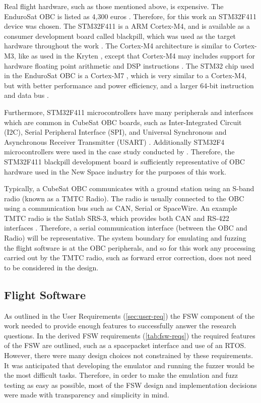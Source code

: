 \documentclass[../report.tex]{subfiles}
\begin{document}
Real flight hardware, such as those mentioned above, is expensive. The
EnduroSat OBC is listed as 4,300 euros \citep{EnduroSat_OBC}. Therefore, for
this work an STM32F411 device was chosen. The STM32F411 is a ARM Cortex-M4, and
is available as a consumer development board called blackpill, which was used
as the target hardware throughout the work \citep{blackpill_info}. The
Cortex-M4 architecture is similar to Cortex-M3, like as used in the Kryten
\citep{Clydespace_Kryten}, except that Cortex-M4 may includes support for
hardware floating point arithmetic and DSP instructions \citep{Cortex_M3}
\citep{Cortex_M4}. The STM32 chip used in the EnduroSat OBC is a Cortex-M7
\citep{EnduroSat_OBC}, which is very similar to a Cortex-M4, but with better
performance and power efficiency, and a larger 64-bit instruction and data bus
\citep{Cortex_M7}.

Furthermore, STM32F411 microcontrollers have many peripherals and interfaces
which are common in CubeSat OBC boards, such as Inter-Integrated Circuit (I2C),
Serial Peripheral Interface (SPI), and Universal Synchronous and Asynchronous
Receiver Transmitter (USART) \citep{Cratere_2024}. Additionally STM32F4
microcontrollers were used in the case study conducted by
\citet{Scharnowski_2023}. Therefore, the STM32F411 blackpill development board
is sufficiently representative of OBC hardware used in the New Space industry
for the purposes of this work.

Typically, a CubeSat OBC communicates with a ground station using an S-band
radio (known as a TMTC Radio). The radio is usually connected to the OBC using
a communication bus such as CAN, Serial or SpaceWire. An example TMTC radio is
the Satlab SRS-3, which provides both CAN and RS-422 interfaces
\citep{Satlab_SRS3}. Therefore, a serial communication interface (between the
OBC and Radio) will be representative. The system boundary for emulating and
fuzzing the flight software is at the OBC peripherals, and so for this work any
processing carried out by the TMTC radio, such as forward error correction, does
not need to be considered in the design.

\subsection{Flight Software} \label{sec:fsw-design}

As outlined in the User Requirements (\autoref{sec:user-req}) the FSW component
of the work needed to provide enough features to successfully answer the
research questions. In the derived FSW requirements (\autoref{tab:fsw-reqs})
the required features of the FSW are outlined, such as a spacepacket interface
and use of an RTOS. However, there were many design choices not constrained
by these requirements. It was anticipated that developing the emulator and
running the fuzzer would be the most difficult tasks. Therefore, in order to
make the emulation and fuzz testing as easy as possible, most of the FSW design
and implementation decisions were made with transparency and simplicity in
mind.
\end{document}
